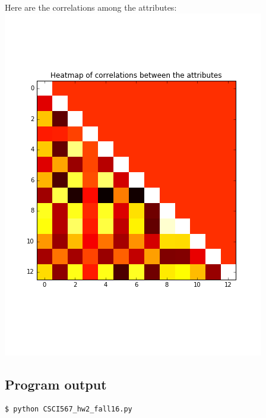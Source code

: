 \documentclass[letterpaper,doc,notimes]{apa6}
\begin{document}
{Here are the correlations among the attributes:\\
\includegraphics[scale=1]{correlation-heatmap}

\subsection{Program output}
\begin{verbatim}
$ python CSCI567_hw2_fall16.py 
 

\end{verbatim}}
\end{document}

